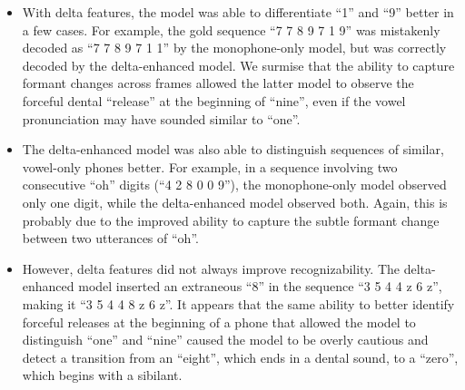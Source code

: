 \documentclass[twocolumn, 11pt]{article}
\begin{document}
\begin{itemize}
  \item With delta features, the model was able to differentiate ``1'' and ``9''
  better in a few cases. For example, the gold sequence ``7 7 8 9 7 1 9'' was
  mistakenly decoded as ``7 7 8 9 7 1 1'' by the monophone-only model, but was
  correctly decoded by the delta-enhanced model. We surmise that the ability to
  capture formant changes across frames allowed the latter model to observe the
  forceful dental ``release'' at the beginning of ``nine'', even if the vowel
  pronunciation may have sounded similar to ``one''.
  \item The delta-enhanced model was also able to distinguish sequences of
  similar, vowel-only phones better. For example, in a sequence involving two
  consecutive ``oh'' digits (``4 2 8 0 0 9''), the monophone-only model observed
  only one digit, while the delta-enhanced model observed both. Again, this is
  probably due to the improved ability to capture the subtle formant change
  between two utterances of ``oh''.
  \item However, delta features did not always improve recognizability. The
  delta-enhanced model inserted an extraneous ``8'' in the sequence ``3 5 4 4 z
  6 z'', making it ``3 5 4 4 8 z 6 z''. It appears that the same ability to
  better identify forceful releases at the beginning of a phone that allowed the
  model to distinguish ``one'' and ``nine'' caused the model to be overly
  cautious and detect a transition from an ``eight'', which ends in a dental
  sound, to a ``zero'', which begins with a sibilant.
\end{itemize}
\end{document}
